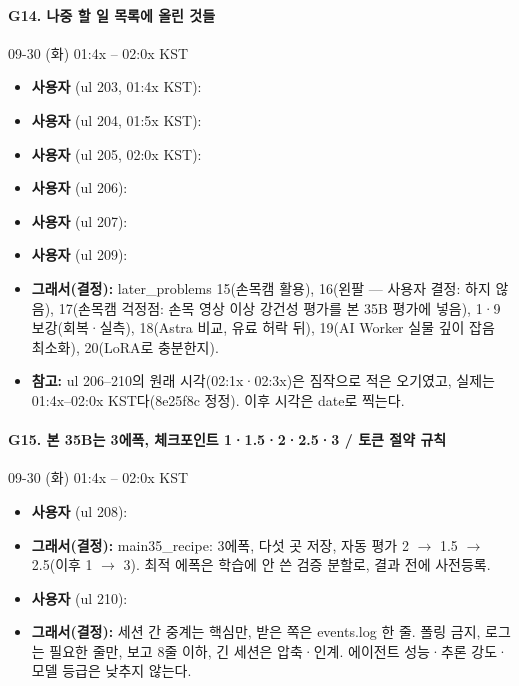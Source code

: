 \paragraph{G14. 나중 할 일 목록에 올린 것들}
{\small 09-30 (화) 01:4x -- 02:0x KST}
\begin{itemize}
  \item \textbf{사용자} (ul 203, 01:4x KST): 
  \item \textbf{사용자} (ul 204, 01:5x KST): 
  \item \textbf{사용자} (ul 205, 02:0x KST): 
  \item \textbf{사용자} (ul 206): 
  \item \textbf{사용자} (ul 207): 
  \item \textbf{사용자} (ul 209): 
  \item \textbf{그래서(결정):} later\_problems 15(손목캠 활용), 16(왼팔 --- 사용자 결정: 하지 않음), 17(손목캠 걱정점: 손목 영상 이상 강건성 평가를 본 35B 평가에 넣음), 1·9 보강(회복·실측), 18(Astra 비교, 유료 허락 뒤), 19(AI Worker 실물 깊이 잡음 최소화), 20(LoRA로 충분한지).
  \item \textbf{참고:} ul 206--210의 원래 시각(02:1x·02:3x)은 짐작으로 적은 오기였고, 실제는 01:4x--02:0x KST다(8e25f8c 정정). 이후 시각은 date로 찍는다.
\end{itemize}

\paragraph{G15. 본 35B는 3에폭, 체크포인트 1·1.5·2·2.5·3 / 토큰 절약 규칙}
{\small 09-30 (화) 01:4x -- 02:0x KST}
\begin{itemize}
  \item \textbf{사용자} (ul 208): 
  \item \textbf{그래서(결정):} main35\_recipe: 3에폭, 다섯 곳 저장, 자동 평가 2 $\rightarrow$ 1.5 $\rightarrow$ 2.5(이후 1 $\rightarrow$ 3). 최적 에폭은 학습에 안 쓴 검증 분할로, 결과 전에 사전등록.
  \item \textbf{사용자} (ul 210): 
  \item \textbf{그래서(결정):} 세션 간 중계는 핵심만, 받은 쪽은 events.log 한 줄. 폴링 금지, 로그는 필요한 줄만, 보고 8줄 이하, 긴 세션은 압축·인계. 에이전트 성능·추론 강도·모델 등급은 낮추지 않는다.
\end{itemize}

